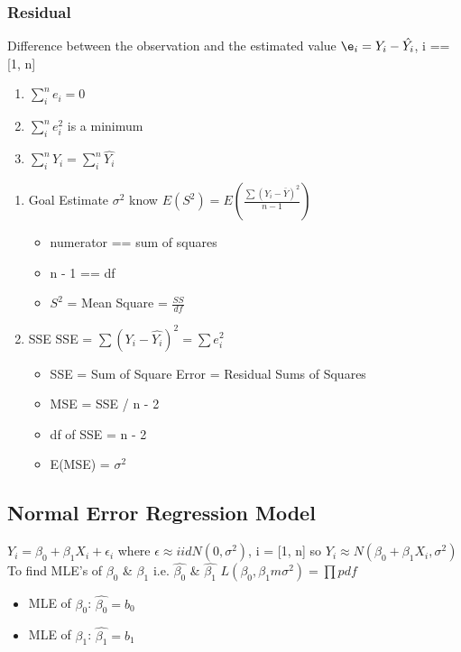 \documentclass[11pt]{article}
\begin{document}
\subsubsection{Residual}
\label{sec:org143d633}
Difference between the observation and the estimated value
\(\e_i  = Y_i - \hat{Y_i}\), i == [1, n]
\begin{enumerate}
\item \(\sum_{i}^{n} e_i = 0\)
\item \(\sum_{i}^{n}e_i^2\) is a minimum
\item \(\sum_{i}^{n}Y_i = \sum_{i}^{n} \hat{Y_i}\)
\end{enumerate}

\begin{enumerate}
\item Goal
\label{sec:orgca102a2}
Estimate \(\sigma^2\)
know \(E(S^2) = E(\frac{\sum(Y_i - \bar{Y})^2}{n - 1})\)
\begin{itemize}
\item numerator == sum of squares
\item n - 1 == df
\item \(S^2\) = Mean Square = \(\frac{SS}{df}\)
\end{itemize}
\item SSE
\label{sec:orgd96b26c}
SSE = \(\sum(Y_i - \hat{Y_i})^2 = \sum e_i^2\)
\begin{itemize}
\item SSE = Sum of Square Error = Residual Sums of Squares
\item MSE = SSE / n - 2
\item df of SSE = n - 2
\item E(MSE) = \(\sigma^2\)
\end{itemize}
\end{enumerate}

\subsection{Normal Error Regression Model}
\label{sec:org9729d94}
\(Y_i = \beta_0 + \beta_1 X_i + \epsilon_i\)
where
\(\epsilon \approx iid N(0,\sigma^2)\), i = [1, n]
so
\(Y_i \approx N(\beta_0 + \beta_1 X_i, \sigma^2)\)
To find MLE's of \(\beta_0\) \& \(\beta_1\) i.e. \(\hat{\beta_0}\) \& \(\hat{\beta_1}\)
\(L(\beta_0, \beta_1m \sigma^2) =\prod pdf\)
\begin{itemize}
\item MLE of \(\beta_0\): \(\hat{\beta_0} = b_0\)
\item MLE of \(\beta_1\): \(\hat{\beta_1} = b_1\)
\end{itemize}
\end{document}
